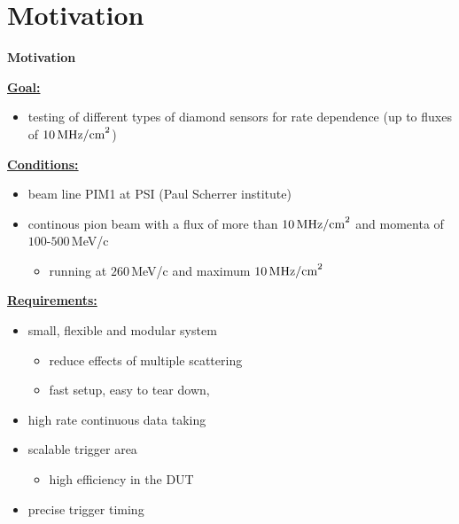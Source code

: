 \documentclass[9pt]{beamer}
\begin{document}
\section{Motivation}
\begin{frame}
	\begin{alertblock}{
		\begin{center}
			\Large{\textbf{Motivation}}
		\end{center}}
	\end{alertblock}
\end{frame}
\begin{frame}
	\underline{\textbf{Goal:}}
	\begin{itemize}
		\item testing of different types of diamond sensors for rate dependence (up to fluxes of $10\,\text{MHz/cm}^{2}$)
	\end{itemize}
	\underline{\textbf{Conditions:}}
	\begin{itemize}
		\item beam line PIM1 at PSI (Paul Scherrer institute)
		\item continous pion beam with a flux of more than $10\,\text{MHz/cm}^{2}$ and momenta of $100$-$500$\,MeV/c
		\begin{itemize}
			\item running at $260$\,MeV/c and maximum $10\,\text{MHz/cm}^{2}$
		\end{itemize}
	\end{itemize}
	\underline{\textbf{Requirements:}}
	\begin{itemize}
		\item small, flexible and modular system
		\begin{itemize}
			\item reduce effects of multiple scattering
			\item fast setup, easy to tear down, 
		\end{itemize}
		\item high rate continuous data taking
		\item scalable trigger area
		\begin{itemize}
			\item high efficiency in the DUT
		\end{itemize}
		\item precise trigger timing
	\end{itemize}
\end{frame}
\end{document}
